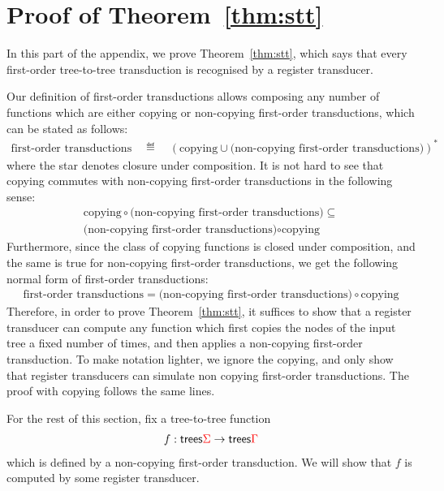 \section{Proof of Theorem~\ref{thm:stt}}
In this part of the appendix, we prove Theorem~\ref{thm:stt}, which says that every first-order tree-to-tree transduction is recognised by a register transducer. 

Our definition of first-order transductions allows composing any number of functions which are either copying or non-copying first-order transductions, which can be stated as follows:
\begin{align*}
\text{first-order transductions} \quad \eqdef \quad (\text{copying} \cup \text{(non-copying first-order transductions)})^*
\end{align*}
where the star denotes closure under composition. It is not hard to see that copying commutes with non-copying first-order transductions in the following sense:
\begin{align*}
    \text{copying} \circ  \text{(non-copying first-order transductions)}  \subseteq   \\ \text{(non-copying first-order transductions)} \circ \text{copying}
    \end{align*}
Furthermore, since the class of copying functions is closed under composition, and the same is true for non-copying first-order transductions, we get the following normal form of first-order transductions:
\begin{align*}
    \text{first-order transductions} =  \text{(non-copying first-order transductions)} \circ \text{copying}
    \end{align*}
Therefore, in order to prove Theorem~\ref{thm:stt}, it suffices to show that a register transducer can compute any function which first copies the nodes of the input tree a fixed number of times, and then applies a non-copying first-order transduction. To make notation lighter, we ignore the copying, and only show that register transducers can simulate non copying first-order transductions. The proof with copying follows the same lines. 

For the rest of this section, fix a tree-to-tree function
\begin{align*}
f : \mathsf {trees} {\color{red}{\Sigma}} \to \mathsf {trees} {\color{red}{\Gamma}}
\end{align*}
which is defined by a non-copying first-order transduction. We will show that $f$ is computed by some register transducer.  

